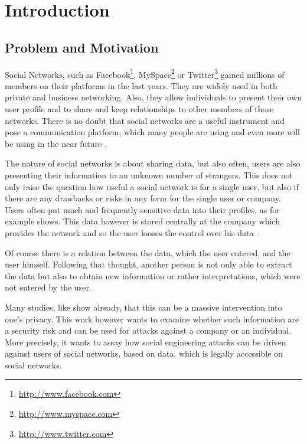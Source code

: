 \chapter{Introduction}
\label{chap:introduction}

\section{Problem and Motivation}

Social Networks, such as Facebook\footnote{\url{http://www.facebook.com}},
MySpace\footnote{\url{http://www.myspace.com}} or
Twitter\footnote{\url{http://www.twitter.com}} gained millions of members on
their platforms in the last years. They are widely used in both private and
business networking. Also, they allow individuals to present their own user
profile and to share and keep relationships to other members of those networks.
There is no doubt that social networks are a useful instrument and pose a
communication platform, which many people are using and even more will be using
in the near future \cite{whitworth2009}.

The nature of social networks is about sharing data, but also often, users are
also presenting their information to an unknown number of strangers. This does
not only raise the question how useful a social network is for a single user,
but also if there are any drawbacks or risks in any form for the single user or
company. Users often put much and frequently sensitive data into their
profiles, as for example \cite{brown2008} shows. This data however is stored
centrally at the company which provides the network and so the user looses the
control over his data~\cite{fraunhofer2008}.

Of course there is a relation between the data, which the user entered, and the
user himself. Following that thought, another person is not only able to
extract the data but also to obtain new information or rather interpretations,
which were not entered by the user.

Many studies, like \cite{fraunhofer2008,gross2005} show already, that this can
be a massive intervention into one's privacy. This work however wants to
examine whether such information are a security risk and can be used for
attacks against a company or an individual. More precisely, it wants to assay
how social engineering attacks can be driven against users of social networks,
based on data, which is legally accessible on social networks.


